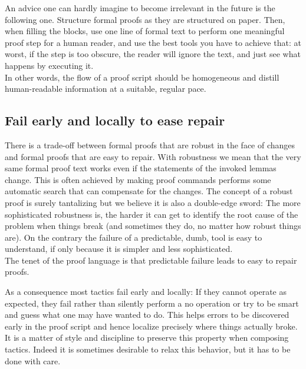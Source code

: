 An advice one can hardly imagine to become irrelevant in the future
is the following one. Structure formal proofs as they are structured on paper.
Then, when filling the blocks, use one line of formal text to perform one
meaningful proof step for a human reader, and use the best tools you have to
achieve that: at worst, if the step is too obscure, the reader will
ignore the text, and just see what happens by executing it.\\
In other words, the flow of a proof script should be homogeneous and
distill human-readable information at a suitable, regular pace.


\subsection{Fail early and locally to ease repair}

There is a trade-off between formal proofs that are robust in the face of
changes and formal proofs that are easy to repair. 
With robustness we mean that the very same formal proof text
works even if the statements of the invoked lemmas change.
This is often achieved by making proof commands performs some automatic
search that can compensate for the changes.
The concept of a robust proof is surely tantalizing but we
believe it is also a double-edge sword: The more
sophisticated robustness is, the harder it can get to identify the
root cause of the problem when things break (and sometimes they do, no
matter how robust things are).  On the
contrary the failure of a predictable, dumb, tool is easy
to understand, if only because it is simpler and less
sophisticated.\\
The tenet of the \mcbSSR{} proof language is that
predictable failure leads to easy to repair proofs.

As a consequence most \mcbSSR{} tactics fail early and locally: If they cannot
operate as expected, they fail rather than silently perform a no
operation or try to be smart and guess what one may have wanted to
do.  This helps errors to be discovered early in the proof script and
hence localize precisely where things actually broke. It is a matter
of style and discipline to preserve this property when composing
\mcbSSR{} tactics.  Indeed it is sometimes desirable to relax this
behavior, but it has to be done with care.


